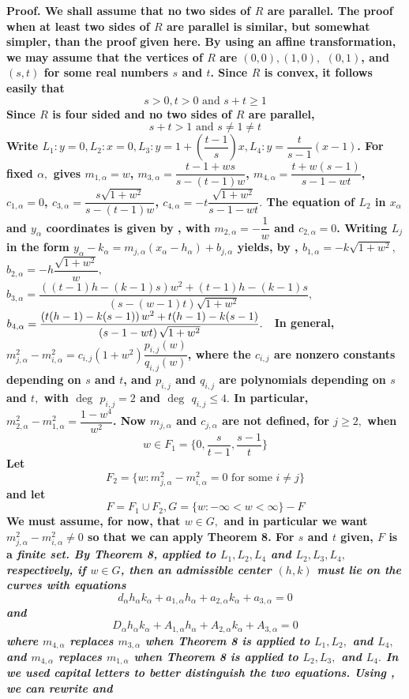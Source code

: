 \nl \bf Proof. \rm We shall assume that no two sides of $R$ are parallel. The proof when at least two sides of $R$ are parallel is similar, but somewhat simpler, than the proof given here. By using an affine transformation, we may assume that the vertices of $R$ are $(0,0),(1,0),$ $(0,1)$, and $(s,t)$ for some real numbers $s$ and $t$. Since $R$ is convex, it follows easily that  $$s>0,t>0\text{ and }s+t\geq 1$$ Since $R$ is four sided and no two sides of $R$ are parallel, $$s+t>1\text{ and }s\neq 1\neq t$$ Write $L_{1}:y=0,L_{2}:x=0,L_{3}:y=1+\left( \dfrac{t-1}{s}\right) x,L_{4}:y=\dfrac{t}{s-1}(x-1)${}. For fixed $\alpha,$  gives $m_{1,\alpha }=\allowbreak w$, $m_{3,\alpha }=\dfrac{t-1+ws}{s-(t-1)w}$, $m_{4,\alpha }=\allowbreak \dfrac{t+w(s-1)}{s-1-wt}$, $c_{1,\alpha }=\allowbreak 0$, $c_{3,\alpha }=\allowbreak \dfrac{s\sqrt{1+w^{2}}}{s-(t-1)w}$, $c_{4,\alpha }=\allowbreak -t\dfrac{\sqrt{1+w^{2}}}{s-1-wt}.$ The equation of $L_{2}$ in $x_{\alpha }$ and $y_{\alpha }$ coordinates is given by , with $m_{2,\alpha }=-\dfrac{1}{w}$ and $c_{2,\alpha }=0$. Writing $L_{j}$ in the form $y_{\alpha }-k_{\alpha }=m_{j,\alpha }(x_{\alpha }-h_{\alpha })+b_{j,\alpha }$ yields, by , $b_{1,\alpha }=\allowbreak -k\sqrt{1+w^{2}},$ \newline $b_{2,\alpha }=\allowbreak -h\dfrac{\sqrt{1+w^{2}}}{w},$ $b_{3,\alpha }=\dfrac{\left( (t-1)h-(k-1)s\right) w^{2}+(t-1)h-(k-1)s}{\left( s-(w-1)t\right) \sqrt{1+w^{2}}},$ \newline $b_{4,\alpha }=\allowbreak \dfrac{\allowbreak \left( t(h-1)-k(s-1)\right) w^{2}+t(h-1)-k(s-1)}{\left( s-1-wt\right) \sqrt{1+w^{2}}}.$ \ In general, \newline $m_{j,\alpha }^{2}-m_{i,\alpha }^{2}=c_{i,j}\allowbreak \left( 1+w^{2}\right) \dfrac{p_{i,j}(w)}{q_{i,j}(w)}$, where the $c_{i,j}$ are nonzero constants depending on $s$ and $t$, and $p_{i,j}$ and $q_{i,j}$ are polynomials depending on $s$ and $t,$ with $\deg $ $p_{i,j}=2$ and $\deg $ $q_{i,j}\leq 4.$ In particular, $m_{2,\alpha }^{2}-m_{1,\alpha }^{2}=\allowbreak \dfrac{1-w^{4}}{w^{2}}$. Now $m_{j,\alpha }$ and $c_{j,\alpha }$ are not defined, for $j\geq 2,$ when $$w\in F_{1}=\{0,\dfrac{s}{t-1},\dfrac{s-1}{t}\}$$ Let $$F_{2}=\{w:m_{j,\alpha }^{2}-m_{i,\alpha }^{2}=0\text{ for some }i\neq j\}$$ and let $$F=F_{1}\cup F_{2},G=\{w:-\infty <w<\infty \}-F$$ We must assume, for now, that $w\in G,$ and in particular we want $m_{j,\alpha }^{2}-m_{i,\alpha }^{2}\neq 0$ so that we can apply Theorem 8. For $s$ and $t$ given, $F$ is a \it finite \rm set. By Theorem 8, applied to $L_{1},L_{2},L_{4}$ and $L_{2},L_{3},L_{4},$ respectively, if $w\in G$, then an admissible center $(h,k)$ must lie on the curves with equations $$d_{\alpha }h_{\alpha }k_{\alpha }+a_{1,\alpha }h_{\alpha }+a_{2,\alpha }k_{\alpha }+a_{3,\alpha }=0\tag{28}$$ and $$D_{\alpha }h_{\alpha }k_{\alpha }+A_{1,\alpha }h_{\alpha }+A_{2,\alpha }k_{\alpha }+A_{3,\alpha }=0\tag{29}$$ where $m_{4,\alpha }$ replaces $m_{3,\alpha }$ when Theorem 8 is applied to $L_{1},L_{2},$ and $L_{4},$ and $m_{4,\alpha }$ replaces $m_{1,\alpha }$ when Theorem 8 is applied to $L_{2},L_{3},$ and $L_{4}.$ In  we used capital letters to better distinguish the two equations. Using , we can rewrite  and 